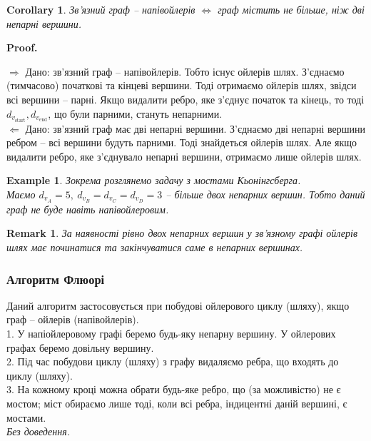 \documentclass[a4paper, 14pt]{extarticle}
\makeatletter
\def\rightproof{$\boxed{\Rightarrow}$ }
\def\leftproof{$\boxed{\Leftarrow}$ }
\theoremstyle{theoremdd}
\theoremstyle{theoremdd}
\theoremstyle{theoremdd}
\theoremstyle{theoremdd}
\theoremstyle{theoremdd}
\newtheorem{example}[theorem]{Example}
\theoremstyle{theoremdd}
\theoremstyle{theoremdd}
\theoremstyle{theoremdd}
\theoremstyle{theoremdd}
\theoremstyle{theoremdd}
\theoremstyle{theoremdd}
\newtheorem{remark}[theorem]{Remark}
\theoremstyle{theoremdd}
\theoremstyle{theoremdd}
\theoremstyle{theoremdd}
\newtheorem{corollary}[theorem]{Corollary}
\theoremstyle{theoremdd}
\renewenvironment{proof}[1][Proof.\\]{\par
\pushQED{\hfill \qed}%
\normalfont \topsep6\p@\@plus6\p@\relax
\trivlist
\item\relax
{\bfseries
#1\@addpunct{.}}\hspace\labelsep\ignorespaces
}{%
\popQED\endtrivlist\@endpefalse
}
\makeatother
\begin{document}
\begin{corollary}
Зв'язний граф -- напівойлерів $\iff$ граф містить не більше, ніж дві непарні вершини.
\end{corollary}

\begin{proof}
\rightproof Дано: зв'язний граф -- напівойлерів. Тобто існує ойлерів шлях. З'єднаємо (тимчасово) початкові та кінцеві вершини. Тоді отримаємо ойлерів шлях, звідси всі вершини -- парні. Якщо видалити ребро, яке з'єднує початок та кінець, то тоді $d_{v_{\text{start}}}, d_{v_{\text{end}}}$, що були парними, стануть непарними.
\bigskip \\
\leftproof Дано: зв'язний граф має дві непарні вершини. З'єднаємо дві непарні вершини ребром -- всі вершини будуть парними. Тоді знайдеться ойлерів шлях. Але якщо видалити ребро, яке з'єднувало непарні вершини, отримаємо лише ойлерів шлях.
\end{proof}

\begin{example}
Зокрема розглянемо задачу з мостами Кьонінгсберга.\\
Маємо $d_{v_A} = 5,\ d_{v_B} = d_{v_C} = d_{v_D} = 3$ -- більше двох непарних вершин. Тобто даний граф не буде навіть напівойлеровим.
\end{example}

\begin{remark}
За наявності рівно двох непарних вершин у зв'язному графі ойлерів шлях має починатися та закінчуватися саме в непарних вершинах.
\end{remark}

\subsubsection*{Алгоритм Флюорі}
Даний алгоритм застосовується при побудові ойлерового циклу (шляху), якщо граф -- ойлерів (напівойлерів).
\bigskip \\
1. У напіойлеровому графі беремо будь-яку непарну вершину. У ойлерових графах беремо довільну вершину.\\
2. Під час побудови циклу (шляху) з графу видаляємо ребра, що входять до циклу (шляху).\\
3. На кожному кроці можна обрати будь-яке ребро, що (за можливістю) не є мостом; міст обираємо лише тоді, коли всі ребра, індицентні даній вершині, є мостами.\\
\textit{Без доведення.}
\end{document}
